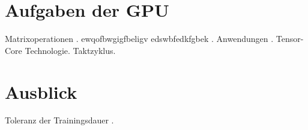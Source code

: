 \documentclass[pdftex,a4paper,halfparskip]{scrartcl}
\begin{document}
\section{Aufgaben der GPU}
Matrixoperationen \cite{gpu-mem-mngmnt}.
ewqofbwgigfbeligv edswbfedkfgbek \cite{nvidia-tensor}.
Anwendungen \cite{nvidia-tensor}.
Tensor-Core Technologie.\cite{nvidia-tensor}
Taktzyklus.\cite{nvidia-tensor}

\pagebreak
\section{Ausblick}
 Toleranz der Trainingsdauer \cite{imagenet-class}.




\end{document}
